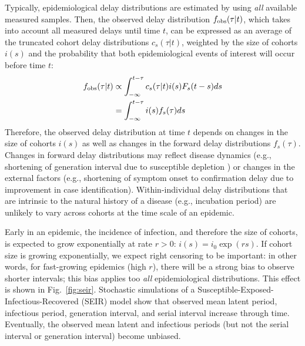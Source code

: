 \documentclass[12pt]{article}
\newcommand{\fref}[1]{Fig.~\ref{fig:#1}}
\begin{document}
Typically, epidemiological delay distributions are estimated by using \emph{all} available measured samples.
Then, the observed delay distribution $f_{\tiny\textrm{obs}}(\tau|t)$, which takes into account all measured delays until time $t$, can be expressed as an average of the truncated cohort delay distributions $c_s(\tau|t)$, weighted by the size of cohorts $i(s)$ and the probability that both epidemiological events of interest will occur before time $t$:
\begin{equation}
\begin{aligned}
f_{\tiny\textrm{obs}}(\tau|t) &\propto \int_{-\infty}^{t-\tau} c_s(\tau|t) i(s) F_s(t-s) ds\\
&= \int_{-\infty}^{t-\tau} i(s) f_s(\tau) ds
\end{aligned}
\end{equation}
Therefore, the observed delay distribution at time $t$ depends on changes in the size of cohorts $i(s)$ as well as changes in the forward delay distributions $f_s(\tau)$.
Changes in forward delay distributions may reflect disease dynamics (e.g., shortening of generation interval due to susceptible depletion \citep{champredon2015intrinsic}) or changes in the external factors (e.g., shortening of symptom onset to confirmation delay due to improvement in case identification).
Within-individual delay distributions that are intrinsic to the natural history of a disease (e.g., incubation period) are unlikely to vary across cohorts at the time scale of an epidemic.

Early in an epidemic, the incidence of infection, and therefore the size of cohorts, is expected to grow exponentially at rate $r > 0$: $i(s) = i_0 \exp(rs)$.
If cohort size is growing exponentially, we expect right censoring to be important: in other words, for fast-growing epidemics (high $r$), there will be a strong bias to observe shorter intervals;
this bias applies too \emph{all} epidemiological distributions.
This effect is shown in \fref{seir}.
Stochastic simulations of a Susceptible-Exposed-Infectious-Recovered (SEIR) model show that observed mean latent period, infectious period, generation interval, and serial interval increase through time.
Eventually, the observed mean latent and infectious periods (but not the serial interval or generation interval) become unbiased.
\end{document}
